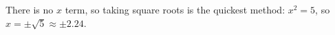 There is no $x$ term, so taking square roots is the quickest method: $x^2=5$, so $x=\pm\sqrt5\approx\boxed{\pm2.24}$.
